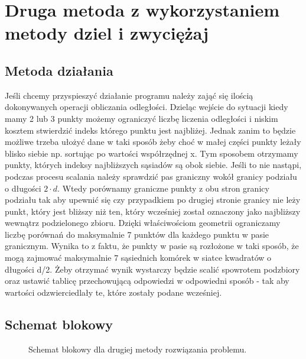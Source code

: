 \documentclass[12pt,twoside]{article}
\begin{document}
\section{Druga metoda z wykorzystaniem metody dziel i zwyciężaj}
\subsection{Metoda działania}
Jeśli chcemy przyspieszyć działanie programu należy zająć się ilością dokonywanych operacji obliczania odległości. 
Dzieląc wejście do sytuacji kiedy mamy 2 lub 3 punkty możemy ograniczyć liczbę liczenia odległości i niskim kosztem stwierdzić indeks którego punktu jest najbliżej. 
Jednak zanim to będzie możliwe trzeba ułożyć dane w taki sposób żeby choć w małej części punkty leżały blisko siebie np. sortując po wartości współrzędnej x.
Tym sposobem otrzymamy punkty, których indeksy najbliższych sąsiadów są obok siebie.
Jeśli to nie nastąpi, podczas procesu scalania należy sprawdzić pas graniczny wokół granicy podziału o długości \(2\cdot{d}\).
Wtedy porównamy graniczne punkty z obu stron granicy podziału tak aby upewnić się czy przypadkiem po drugiej stronie granicy nie leży punkt, który jest bliższy niż ten, który wcześniej został oznaczony jako najbliższy wewnątrz podzielonego zbioru.
Dzięki właściwościom geometrii ograniczamy liczbę porównań do maksymalnie 7 punktów dla każdego punktu w pasie granicznym.
Wynika to z faktu, że punkty w pasie są rozłożone w taki sposób, że mogą zajmować maksymalnie 7 sąsiednich komórek w siatce kwadratów o długości d/2.
Żeby otrzymać wynik wystarczy będzie scalić spowrotem podzbiory oraz ustawić tablicę przechowującą odpowiedzi w odpowiedni sposób - tak aby wartości odzwierciedlały te, które zostały podane wcześniej.
\clearpage
\subsection{Schemat blokowy}

\begin{figure}[h!]
    \centering
    \hspace{-17cm}
\end{figure}
\clearpage
\begin{figure}[h!]
    \centering
    \hspace{-19cm}
    \caption{\label{fig:schematmet2}Schemat blokowy dla drugiej metody rozwiązania problemu.}
\end{figure}
\clearpage
\end{document}
